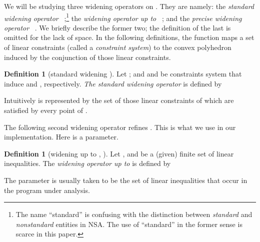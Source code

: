 \documentclass[envcountsect,orivec]{llncs} \pdfoutput=1
\newif\ifignore \ignorefalse
\newcommand{\auxproof}[1]{
\ifignore\mbox{}\newline
\textbf{BEGIN: AUX-PROOF} \dotfill\newline
{#1}\mbox{}\newline
\textbf{END: AUX-PROOF}\dotfill\newline
\fi}
\theoremstyle{definition}
\newtheorem{mydef}[mythm]{Definition}
\begin{document}
\auxproof{
\begin{mydef}
A \emph{generator system} is a triple  of finite sets of
 vectors.
Here 
 
is the set of \emph{lines},  is the set of \emph{rays} and  is the
 set of \emph{points}.

A generator system  induces a
 convex polyhedron  in the following way, where
  is the set of nonnegative reals.

\end{mydef}
}









We will be studying three widening operators on . 
They are namely:
the \emph{standard widening operator} ~\cite{Halbwachs1979};\footnote{The name ``standard'' is
 confusing with the distinction between \emph{standard} and
 \emph{nonstandard} entities in NSA. The  use of ``standard'' in the
 former sense is scarce in
 this paper.}
the \emph{widening operator  up to }~\cite{Halbwachs1993, Halbwachs1997}; and
the \emph{precise widening operator} ~\cite{Bagnara2005}.
We  briefly describe the former two; the definition of the last is
omitted for the lack of space. In the following definitions, the function  maps a set of linear constraints (called a \emph{constraint system}) to the convex polyhedron induced by the conjunction of those linear constraints.


\begin{mydef}[standard widening ]\label{def:stdwiden}
 Let ; and  and  be constraints
 system that induce  and , respectively.
\emph{The standard widening operator}  is defined by

\end{mydef}
\noindent Intuitively  is represented by the set of those linear
constraints of  which are satisfied by every point of .



The following second widening operator  refines . This is
what we use in our implementation. Here  is a parameter.
\begin{mydef}[widening up to , ]\label{def:widenupto}
 Let , and  be a (given) finite set of linear inequalities.
The \emph{widening operator up to } is defined by
 
\end{mydef}
\noindent 
The parameter    is usually taken to be the set of linear
inequalities that occur in the  program under analysis.
\end{document}
